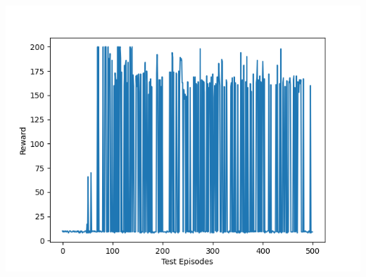 \documentclass[12pt]{article}
\begin{document}
\begin{tcolorbox}[height=45em, width=\textwidth]
\begin{center}
        \hfill%
        \begin{minipage}{0.32\textwidth}
            \includegraphics[width=\textwidth]{outputs/plots/sim_10/testing/test_rewards.png}
        \end{minipage}
        
        \vspace{1em}
        

\end{center}
\end{tcolorbox}
\end{document}
